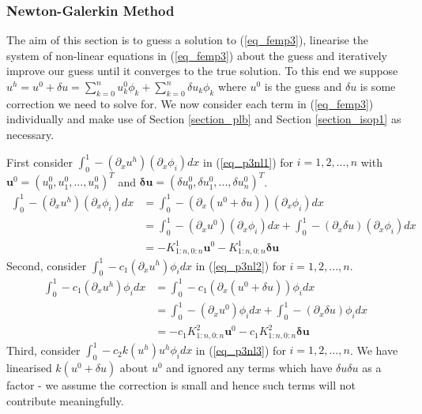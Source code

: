 \documentclass[11pt,fleqn]{article}
\theoremstyle{defstyle}
\begin{document}
\subsubsection{Newton-Galerkin Method}
The aim of this section is to guess a solution to (\ref{eq_femp3}), linearise the system of non-linear equations in (\ref{eq_femp3}) about the guess and iteratively improve our guess until it converges to the true solution. To this end we suppose $u^h = u^0 + \delta u = \sum_{k=0}^n u^0_k\phi_k + \sum_{k=0}^n \delta u_k\phi_k$ where $u^0$ is the guess and $\delta u$ is some correction we need to solve for. We now consider each term in (\ref{eq_femp3}) individually and make use of Section \ref{section_plb} and Section \ref{section_isop1} as necessary.

First consider $\int_0^1 -(\partial_xu^h)(\partial_x\phi_i)dx$  in (\ref{eq_p3nl1}) for $i=1,2,...,n$ with $\mathbf{u}^0 = \left(u^0_0,u^0_1,...,u^0_n\right)^T$ and $\mathbf{\delta u} = \left(\delta u^0_0,\delta u^0_1,...,\delta u^0_n\right)^T$.
\begin{equation}
\begin{aligned}
\int_0^1 -(\partial_xu^h)(\partial_x\phi_i)dx &= \int_0^1 -(\partial_x(u^0 + \delta u))(\partial_x\phi_i)dx \\
&=\int_0^1 -(\partial_xu^0)(\partial_x\phi_i)dx + \int_0^1 -(\partial_x\delta u)(\partial_x\phi_i)dx \\
& = -K^1_{1:n,0:n}\mathbf{u}^0 - K^1_{1:n,0:n}\mathbf{\delta u}
\end{aligned}
\label{eq_p3nl1}
\end{equation}
Second, consider $\int_0^1 -c_1(\partial_xu^h)\phi_idx$ in (\ref{eq_p3nl2}) for $i=1,2,...,n$.
\begin{equation}
\begin{aligned}
\int_0^1 -c_1(\partial_xu^h)\phi_idx &= \int_0^1 -c_1(\partial_x(u^0 + \delta u))\phi_idx \\
&=\int_0^1 -(\partial_xu^0)\phi_idx + \int_0^1 -(\partial_x\delta u)\phi_idx \\
& = -c_1K^2_{1:n,0:n}\mathbf{u}^0 - c_1K^2_{1:n,0:n}\mathbf{\delta u}
\end{aligned}
\label{eq_p3nl2}
\end{equation}
Third, consider $\int_0^1  -c_2k(u^h)u^h\phi_idx$ in (\ref{eq_p3nl3}) for $i=1,2,...,n$. We have linearised $k(u^0 + \delta u)$ about $u^0$ and ignored any terms which have $\delta u \delta u$ as a factor - we assume the correction is small and hence such terms will not contribute meaningfully.
\end{document}
